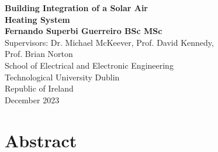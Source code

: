 
\begin{center}
	{\Huge {\bf Building Integration of a Solar Air \\ Heating System}} \\
	\vspace{3cm}
	{\LARGE {\bf Fernando Superbi Guerreiro BSc MSc}} \\
	\vspace*{1.5cm}
	\vfill
	{\large Supervisors: Dr. Michael McKeever, Prof. David Kennedy, \\
	    Prof. Brian Norton \\
		School of Electrical and Electronic Engineering \\
		Technological University Dublin \\
		Republic of Ireland \\
		December 2023 \\
	}
\end{center}

\chapter*{Abstract}
\vspace*{1cm}

